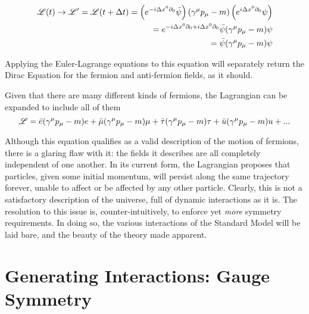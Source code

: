     \begin{equation} \begin{split}
        \mathscr{L}(t) \to \mathscr{L}' = \mathscr{L}(t+\Delta t) =
            \left( e^{-i\Delta x^0 \partial_0} \bar{\psi} \right) (\gamma^\mu p_\mu - m) \left( e^{i\Delta x^0 \partial_0}\psi \right)
        \\  = e^{-i\Delta x^0 \partial_0 + i \Delta x^0 \partial_0} \bar{\psi} (\gamma^\mu p_\mu - m) \psi
        \\  = \bar{\psi} (\gamma^\mu p_\mu - m) \psi
    \end{split} \end{equation}

    Applying the Euler-Lagrange equations to this equation will separately return the Dirac Equation
        for the fermion and anti-fermion fields, as it should.

    Given that there are many different kinds of fermions, the Lagrangian can be expanded to include all of them
    \begin{equation}
        \mathscr{L} = \bar{e} (\gamma^\mu p_\mu - m) e
        + \bar{\mu} (\gamma^\mu p_\mu - m) \mu
        + \bar{\tau} (\gamma^\mu p_\mu - m) \tau
        + \bar{u} (\gamma^\mu p_\mu - m) u
        + ...
    \end{equation}

    Although this equation qualifies as a valid description of the motion of fermions,
        there is a glaring flaw with it: the fields it describes are all completely independent of one another.
    In its current form, the Lagrangian proposes that particles, given some initial momentum,
        will persist along the same trajectory forever, unable to affect or be affected by any other particle.
    Clearly, this is not a satisfactory description of the universe, full of dynamic interactions as it is.
    The resolution to this issue is, counter-intuitively, to enforce yet \textit{more} symmetry requirements.
    In doing so, the various interactions of the Standard Model will be laid bare,
        and the beauty of the theory made apparent.



\section{Generating Interactions: Gauge Symmetry} \label{sec:gauge_symmetry}

